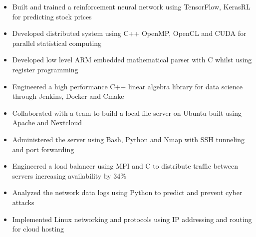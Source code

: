 \documentclass[11pt,a4paper,ragged2e]{altacv}
\begin{document}
\begin{paracol}{1}
\begin{itemize}
\item Built and trained a reinforcement neural network using TensorFlow, KerasRL for predicting stock prices
\item Developed distributed system using C++ OpenMP, OpenCL and CUDA for parallel statistical computing
\item Developed low level ARM embedded mathematical parser with C whilst using register programming
\item Engineered a high performance C++ linear algebra library for data science through Jenkins, Docker and Cmake
\end{itemize}
\tightdivider


\begin{itemize}
\item Collaborated with a team to build a local file server on Ubuntu built using Apache and Nextcloud
\item Administered the server using Bash, Python and Nmap with SSH tunneling and port forwarding
\item Engineered a load balancer using MPI and C to distribute traffic between servers increasing availability by 34\%
\item Analyzed the network data logs using Python to predict and prevent cyber attacks
\item Implemented Linux networking and protocols using IP addressing and routing for cloud hosting
\end{itemize}


\end{paracol}
\end{document}
